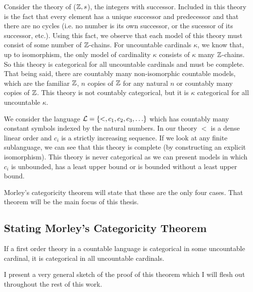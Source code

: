 \begin{example}\label{example_categoricity_integers}
Consider the theory of (\(\mathbb{Z}, s\)), the integers with successor. 
Included in this theory is the fact that every element has a unique successor and predecessor and that there are no cycles (i.e. no number is its own successor, or the sucessor of its successor, etc.). 
Using this fact, we observe that each model of this theory must consist of some number of \(\mathbb{Z}\)-chains. 
For uncountable cardinals \(\kappa\), we know that, up to isomorphism, the only model of cardinality \(\kappa\) consists of \(\kappa\) many \(\mathbb{Z}\)-chains. 
So this theory is categorical for all uncountable cardinals and must be complete. 
That being said, there are countably many non-isomorphic countable models, which are the familiar \(\mathbb{Z}\), \(n\) copies of \(\mathbb{Z}\) for any natural \(n\) or countably many copies of \(\mathbb{Z}\). 
This theory is not countably categorical, but it is \(\kappa\) categorical for all uncountable \(\kappa\). 
\end{example}

\begin{example}\label{example_categoricity_sequence}
We consider the language \(\mathcal{L} = \{<, c_1, c_2, c_3, \ldots\}\) which has countably many constant symbols indexed by the natural numbers. 
In our theory \(<\) is a dense linear order and \(c_i\) is a strictly increasing sequence. 
If we look at any finite sublanguage, we can see that this theory is complete (by constructing an explicit isomorphism). %
This theory is never categorical as we can present models in which \(c_i\) is unbounded, has a least upper bound or is bounded without a least upper bound. 
\end{example}

Morley's categoricity theorem will state that these are the only four cases. 
That theorem will be the main focus of this thesis. 

\subsection{Stating Morley's Categoricity Theorem}

\begin{theorem}\label{theorem_morleys_categoricity}
If a first order theory in a countable language is categorical in some uncountable cardinal, it is categorical in all uncountable cardinals. 
\end{theorem}

I present a very general sketch of the proof of this theorem which I will flesh out throughout the rest of this work. 

